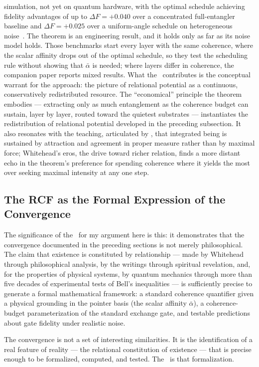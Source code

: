 simulation, not yet on quantum hardware, with the optimal schedule
achieving fidelity advantages of up to $\Delta F = +0.040$ over a
concentrated full-entangler baseline and $\Delta F = +0.025$ over a
uniform-angle schedule on heterogeneous noise~\citep{Adams2026Physics}.
The theorem is an engineering result, and it holds only as far as its
noise model holds.
Those benchmarks start every layer with the same coherence, where the
scalar affinity drops out of the optimal schedule, so they test the
scheduling rule without showing that $\bar\alpha$ is needed; where
layers differ in coherence, the companion paper reports mixed results.
What the \RCF\ contributes is the conceptual warrant for the approach:
the picture of relational potential as a continuous, conservatively
redistributed resource.
The ``economical'' principle the theorem embodies --- extracting only
as much entanglement as the coherence budget can sustain, layer by
layer, routed toward the quietest substrates --- instantiates the
redistribution of relational potential developed in the preceding
subsection.
It also resonates with the \bahai teaching, articulated by \AbdulBaha,
that integrated being is sustained by attraction and agreement in proper
measure rather than by maximal force; Whitehead's eros, the drive toward
richer relation, finds a more distant echo in the theorem's preference
for spending coherence where it yields the most over seeking maximal
intensity at any one step.

\subsection{The RCF as the Formal Expression of the Convergence}

The significance of the \RCF\ for my argument here is this:
it demonstrates that the convergence documented in the preceding sections
is not merely philosophical.
The claim that existence is constituted by relationship --- made
by Whitehead through philosophical analysis, by the \bahai writings
through spiritual revelation, and, for the properties of physical
systems, by quantum mechanics through more than five decades of
experimental tests of Bell's inequalities --- is
sufficiently precise to generate a formal mathematical framework: a
standard coherence quantifier given a physical grounding in the pointer
basis (the scalar affinity $\bar\alpha$), a coherence-budget
parameterization of the standard exchange gate, and testable predictions
about gate fidelity under realistic noise.

The convergence is not a set of interesting similarities.
It is the identification of a real feature of reality --- the relational
constitution of existence --- that is precise enough to be formalized,
computed, and tested.
The \RCF\ is that formalization.
